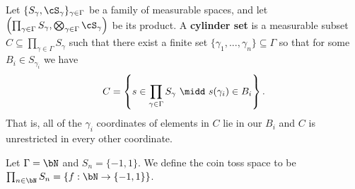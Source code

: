 \begin{defn}\label{defn:product-cylinder}
  Let $\{S_\gamma,\cS_\gamma\}_{\gamma \in \Gamma}$ be a family of measurable spaces, and let $\left(\prod_{\gamma \in \Gamma}S_\gamma, \bigotimes_{\gamma \in \Gamma} \cS_\gamma\right)$ be its product. A \textbf{cylinder set} is a measurable subset $C \subseteq \prod_{\gamma \in \Gamma} S_\gamma$ such that there exist a finite set $\{\gamma_1,...,\gamma_n\}\subseteq \Gamma$ so that for some $B_i \in S_{\gamma_i}$ we have
  \begin{align*}
    C = \left\{s \in \prod_{\gamma \in \Gamma} S_\gamma ~\midd~ s(\gamma_i) \in B_i\right\}.
  \end{align*}
  That is, all of the $\gamma_i$ coordinates of elements in $C$ lie in our $B_i$ and $C$ is unrestricted in every other coordinate.
\end{defn}

\begin{example}\label{example:coin-toss-space}
  Let $\Gamma = \bN$ and $S_n = \{-1,1\}$. We define the coin toss space to be $\prod_{n \in \bN} S_n = \{f : \bN \to \{-1,1\}\}$.
\end{example}
\printbibliography

